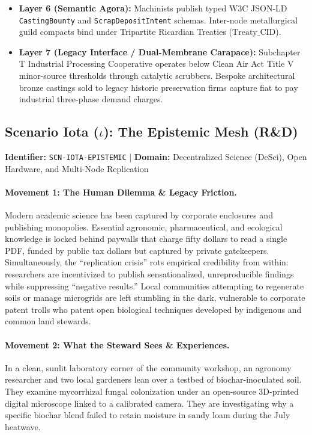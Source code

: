 \begin{itemize}
    \item \textbf{Layer 6 (Semantic Agora):} Machinists publish typed W3C JSON-LD \texttt{CastingBounty} and \texttt{ScrapDepositIntent} schemas. Inter-node metallurgical guild compacts bind under Tripartite Ricardian Treaties ($\mathrm{Treaty\_CID}$).
    \item \textbf{Layer 7 (Legacy Interface / Dual-Membrane Carapace):} Subchapter T Industrial Processing Cooperative operates below Clean Air Act Title V minor-source thresholds through catalytic scrubbers. Bespoke architectural bronze castings sold to legacy historic preservation firms capture fiat to pay industrial three-phase demand charges.
\end{itemize}

\subsection{Scenario Iota (\texorpdfstring{$\iota$}{Iota}): The Epistemic Mesh (R\&D)}
\label{subsec:scn_iota}
\textbf{Identifier:} \texttt{SCN-IOTA-EPISTEMIC} \quad | \quad \textbf{Domain:} Decentralized Science (DeSci), Open Hardware, and Multi-Node Replication

\paragraph{Movement 1: The Human Dilemma \& Legacy Friction.}
Modern academic science has been captured by corporate enclosures and publishing monopolies. Essential agronomic, pharmaceutical, and ecological knowledge is locked behind paywalls that charge fifty dollars to read a single PDF, funded by public tax dollars but captured by private gatekeepers. Simultaneously, the ``replication crisis'' rots empirical credibility from within: researchers are incentivized to publish sensationalized, unreproducible findings while suppressing ``negative results.'' Local communities attempting to regenerate soils or manage microgrids are left stumbling in the dark, vulnerable to corporate patent trolls who patent open biological techniques developed by indigenous and common land stewards.

\paragraph{Movement 2: What the Steward Sees \& Experiences.}
In a clean, sunlit laboratory corner of the community workshop, an agronomy researcher and two local gardeners lean over a testbed of biochar-inoculated soil. They examine mycorrhizal fungal colonization under an open-source 3D-printed digital microscope linked to a calibrated camera. They are investigating why a specific biochar blend failed to retain moisture in sandy loam during the July heatwave. 

